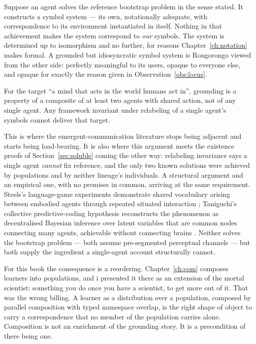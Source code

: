 Suppose an agent solves the reference bootstrap problem in the
sense stated.
It constructs a symbol system --- its own, notationally adequate,
with correspondence to its environment instantiated in itself.
Nothing in that achievement makes the system correspond to
\emph{our} symbols.
The system is determined up to isomorphism and no further, for
reasons Chapter~\ref{ch:notation} makes formal.
A grounded but idiosyncratic symbol system is Rongorongo viewed
from the other side: perfectly meaningful to its users, opaque to
everyone else, and opaque for exactly the reason given in
Observation~\ref{obs:locus}.

\begin{observation}
\label{obs:social}
For the target ``a mind that acts in the world humans act in'',
grounding is a property of a composite of at least two agents with
shared action, not of any single agent.
Any framework invariant under relabeling of a single agent's
symbols cannot deliver that target.
\end{observation}

\noindent
This is where the emergent-communication literature stops being
adjacent and starts being load-bearing.
It is also where this argument meets the existence proofs of
Section~\ref{sec:soluble} coming the other way: relabeling
invariance says a single agent \emph{cannot} fix reference, and the
only two known solutions were achieved by populations and by
neither lineage's individuals.
A structural argument and an empirical one, with no premises in
common, arriving at the same requirement.
Steels's language-game experiments demonstrate shared vocabulary
arising between embodied agents through repeated situated
interaction \cite{steels2015}; Taniguchi's collective
predictive-coding hypothesis reconstructs the phenomenon as
decentralised Bayesian inference over latent variables that are
common nodes connecting many agents, achievable without connecting
brains \cite{taniguchi2024}.
Neither solves the bootstrap problem --- both assume pre-segmented
perceptual channels --- but both supply the ingredient a
single-agent account structurally cannot.

For this book the consequence is a reordering.
Chapter~\ref{ch:com} composes learners into populations, and i
presented it there as an extension of the mortal scientist:
something you do once you have a scientist, to get more out of it.
That was the wrong billing.
A learner as a distribution over a population, composed by parallel
composition with typed namespace overlap, is the right shape of
object to carry a correspondence that no member of the population
carries alone.
Composition is not an enrichment of the grounding story.
It is a precondition of there being one.

